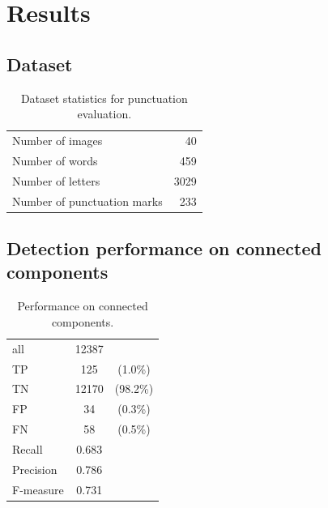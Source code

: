 \documentclass[12pt,a4paper]{report}
\begin{document}
\section{Results}
\subsection{Dataset}
\begin{table}[htbp]
    \centering
    \begin{tabular}{lr}
        \toprule
        Number of images & 40 \\
        Number of words & 459 \\
        Number of letters & 3029 \\
        Number of punctuation marks & 233 \\
        \bottomrule
    \end{tabular}
    \caption{Dataset statistics for punctuation evaluation.}
    \label{tab:punctuation-dataset}
\end{table}

\subsection{Detection performance on connected components}
\begin{table}[htbp]
    \centering
    \begin{tabular}{lcc}
        \toprule
        all & 12387 & \\
        TP & 125 & (1.0\%) \\
        TN & 12170 & (98.2\%) \\
        FP & 34 & (0.3\%) \\
        FN & 58 & (0.5\%) \\
        \midrule
        Recall & 0.683 & \\
        Precision & 0.786 & \\
        F-measure & 0.731 & \\
        \bottomrule
    \end{tabular}
    \caption{Performance on connected components.}
    \label{tab:punctuation-cc}
\end{table}
\end{document}

